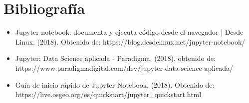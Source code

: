\documentclass[12pt]{article}
\begin{document}
\section{Bibliografía}
\begin{itemize}
\item Jupyter notebook: documenta y ejecuta código desde el navegador | Desde Linux. (2018). Obtenido de: 
https://blog.desdelinux.net/jupyter-notebook/
\item Jupyter: Data Science aplicada - Paradigma. (2018). obtenido de:\\
https://www.paradigmadigital.com/dev/jupyter-data-science-aplicada/
\item Guía de inicio rápido de Jupyter Notebook. (2018). Obtenido de: \\https://live.osgeo.org/es/quickstart/jupyter\_quickstart.html
\end{itemize}
\end{document}
